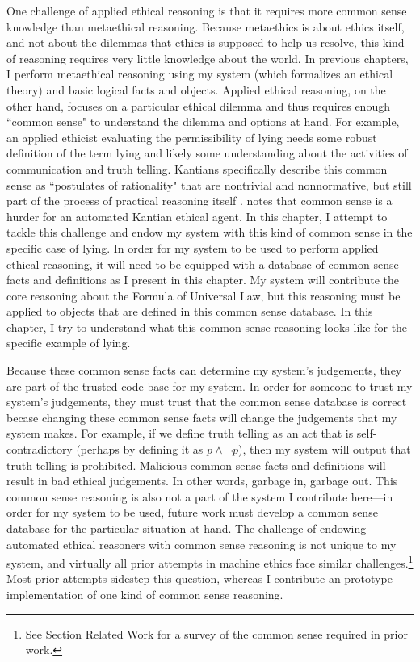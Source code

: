 \begin{isabellebody}
\begin{isamarkuptext}
One challenge of applied ethical reasoning is that it requires more common sense knowledge than metaethical
reasoning. Because metaethics is about ethics itself, and not about the dilemmas that ethics is 
supposed to help us resolve, this kind of reasoning requires very little knowledge about the world. 
In previous chapters, I perform metaethical reasoning using my system (which formalizes an 
ethical theory) and basic logical facts and objects. Applied ethical reasoning, on the other hand,
focuses on a particular ethical dilemma and thus requires enough 
``common sense" to understand the dilemma and options at hand. For example, an applied ethicist 
evaluating the permissibility of lying needs some robust definition of the term lying and likely some
understanding about the activities of communication and truth telling. Kantians specifically describe
this common sense as ``postulates of rationality" that are nontrivial and nonnormative, but still
part of the process of practical reasoning itself \citep{silber}. \citet{powers} notes that common sense 
is a hurder for an automated Kantian ethical agent. In this chapter, I attempt to tackle this challenge and
endow my system with this kind of common sense in the specific case of lying. In order for my 
system to be used to perform applied ethical reasoning, it will need to be equipped with a database
of common sense facts and definitions as I present in this chapter. My system will contribute the core
reasoning about the Formula of Universal Law, but this reasoning must be applied to objects that are defined
in this common sense database. In this chapter, I try to understand what this common sense reasoning looks like
for the specific example of lying. 

Because these common sense facts can determine my system's judgements, they are part of the trusted
code base for my system. In order for someone to trust my system's judgements, they must trust that the
common sense database is correct becase changing these common sense facts will change the judgements 
that my system makes. For example, if we define truth telling as an act that is self-contradictory (perhaps
by defining it as $p \wedge \neg p$), then my system will output that truth telling is prohibited.
Malicious common sense facts and definitions will result in bad ethical judgements. In other words, garbage in, 
garbage out. This common sense reasoning is also not a part of the system I contribute here—in order for my
system to be used, future work must develop a common sense database for the particular situation at hand. 
The challenge of endowing automated ethical reasoners with common sense reasoning is not unique to my 
system, and virtually all prior attempts in machine ethics face similar challenges.\footnote{See Section
Related Work for a survey of the common sense required in prior work.} Most prior attempts
sidestep this question, whereas I contribute an prototype implementation of one kind of common sense reasoning.


\end{isamarkuptext}
\end{isabellebody}
